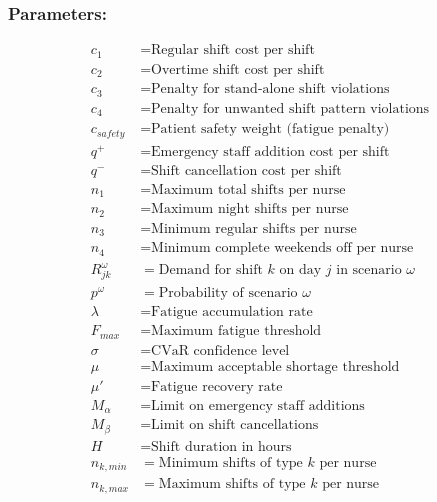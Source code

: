 \documentclass[10pt,a4paper,twocolumn]{article}
\begin{document}
\subsubsection{Parameters:}
\begin{align*}
c_1 &= \text{Regular shift cost per shift} \\
c_2 &= \text{Overtime shift cost per shift} \\
c_3 &= \text{Penalty for stand-alone shift violations} \\
c_4 &= \text{Penalty for unwanted shift pattern violations} \\
c_{safety} &= \text{Patient safety weight (fatigue penalty)} \\
q^+ &= \text{Emergency staff addition cost per shift} \\
q^- &= \text{Shift cancellation cost per shift} \\
n_1 &= \text{Maximum total shifts per nurse} \\
n_2 &= \text{Maximum night shifts per nurse} \\
n_3 &= \text{Minimum regular shifts per nurse} \\
n_4 &= \text{Minimum complete weekends off per nurse} \\
R_{jk}^{\omega} &= \text{Demand for shift } k \text{ on day } j \text{ in scenario } \omega \\
p^{\omega} &= \text{Probability of scenario } \omega \\
\lambda &= \text{Fatigue accumulation rate} \\
F_{max} &= \text{Maximum fatigue threshold} \\
\sigma &= \text{CVaR confidence level} \\
\mu &= \text{Maximum acceptable shortage threshold} \\
\mu' &= \text{Fatigue recovery rate} \\
M_{\alpha} &= \text{Limit on emergency staff additions} \\
M_{\beta} &= \text{Limit on shift cancellations} \\
H &= \text{Shift duration in hours} \\
n_{k,min} &= \text{Minimum shifts of type } k \text{ per nurse} \\
n_{k,max} &= \text{Maximum shifts of type } k \text{ per nurse}
\end{align*}
\end{document}

